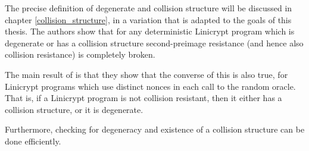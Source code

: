 \begin{pchstack}[center,space=2cm]
\end{pchstack}

The precise definition of degenerate and collision structure will be discussed in chapter \ref{collision_structure},
in a variation that is adapted to the goals of this thesis.
The authors show that for any deterministic Linicrypt program which is degenerate
or has a collision structure
second-preimage resistance (and hence also collision resistance) is completely broken.

The main result of \cite{C:CarRos16} is that they show that the converse of this is also true,
for Linicrypt programs which use distinct nonces in each call to the random oracle.
That is, if a Linicrypt program is not collision resistant,
then it either has a collision structure, or it is degenerate.

Furthermore, checking for degeneracy and existence of a collision structure can be done efficiently.
